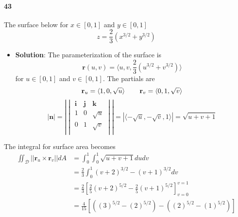 \documentclass{article}
\begin{document}
    \paragraph{43} The surface below for $x \in [0,1]$ and $y \in [0,1]$
    \[ z=\frac{2}{3}(x^{3/2}+y^{3/2}) \]
    \begin{itemize}
        \item \textbf{Solution}: The parameterization of the surface is
        \[ \mathbf{r}(u,v) = \langle u,v, \frac{2}{3}(u^{3/2} + v^{3/2}) \rangle \]
        for $u \in [0,1]$ and $v \in [0,1]$. The partials are
        \[ \mathbf{r}_u = \langle 1, 0, \sqrt{u}\rangle \hspace{0.3in} \mathbf{r}_v = \langle 0, 1, \sqrt{v} \rangle \]
        \[ 
            |\mathbf{n}| = |\begin{vmatrix}
                \mathbf{i} & \mathbf{j} & \mathbf{k}\\
                1 & 0 & \sqrt{u}\\
                0 & 1 & \sqrt{v}\\
            \end{vmatrix}| = |\langle -\sqrt{u}, -\sqrt{v}, 1 \rangle | = \sqrt{u + v + 1}
        \]
    \end{itemize}
    The integral for surface area becomes
    \begin{align*}
        \iint_{\mathcal{D}} ||\mathbf{r}_u \times \mathbf{r}_v|| dA &= \int_0^1 \int_0^1 \sqrt{u+v+1} dudv \\
        &= \frac{2}{3}\int_0^1 (v+2)^{3/2}-(v+1)^{3/2} dv\\
        &= \frac{2}{3}[\frac{2}{5}(v+2)^{5/2}-\frac{2}{5}(v+1)^{5/2}]_{v=0}^{v=1} \\
        &= \frac{4}{15}[((3)^{5/2}-(2)^{5/2})-((2)^{5/2}-(1)^{5/2})]
    \end{align*}
    
\end{document}

